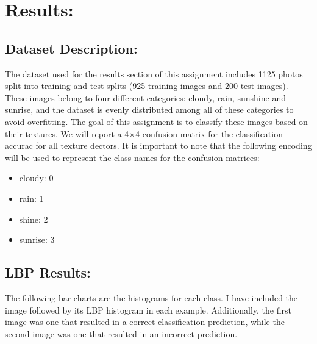 \documentclass{article}
\begin{document}
\section{Results:}
\subsection{Dataset Description:}
The dataset used for the results section of this assignment includes 1125 photos split into training and test splits (925 training images and 200 test images). These images belong to four different categories: cloudy, rain, sunshine and sunrise, and the dataset is evenly distributed among all of these categories to avoid overfitting. The goal of this assignment is to classify these images based on their textures. We will report a 4$\times$4 confusion matrix for the classification accurac for all texture dectors. It is important to note that the following encoding will be used to represent the class names for the confusion matrices:
\begin{itemize}
    \item cloudy: 0
    \item rain: 1 
    \item shine: 2 
    \item sunrise: 3
\end{itemize}

\subsection{LBP Results:}
The following bar charts are the histograms for each class. I have included the image followed by its LBP histogram in each example. Additionally, the first image was one that resulted in a correct classification prediction, while the second image was one that resulted in an incorrect prediction.
\end{document}
